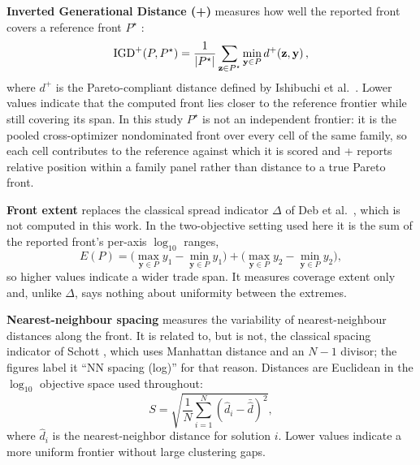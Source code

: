         \textbf{Inverted Generational Distance (\IGD{}+)} measures how well the reported front covers a reference front \(P^\star\) \cite{veldhuizen1999moo,ishibuchi2015igd}:
        \begin{equation}
            \mathrm{IGD}^+(P,P^\star)
            = \frac{1}{|P^\star|}\sum_{\mathbf{z}\in P^\star}
              \min_{\mathbf{y}\in P} d^+\!\left(\mathbf{z},\mathbf{y}\right),
        \end{equation}
        where \(d^+\) is the Pareto-compliant distance defined by Ishibuchi et al.\ \cite{ishibuchi2015igd}. Lower values indicate that the computed front lies closer to the reference frontier while still covering its span. In this study \(P^\star\) is not an independent frontier: it is the pooled cross-optimizer nondominated front over every cell of the same family, so each cell contributes to the reference against which it is scored and \IGD{}+ reports relative position within a family panel rather than distance to a true Pareto front.

        \textbf{Front extent} replaces the classical spread indicator \(\Delta\) of Deb et al.\ \cite{deb2002nsgaii}, which is not computed in this work. In the two-objective setting used here it is the sum of the reported front's per-axis \(\log_{10}\) ranges,
        \begin{equation}
            E(P)=\bigl(\max_{\mathbf{y}\in P}y_1-\min_{\mathbf{y}\in P}y_1\bigr)+\bigl(\max_{\mathbf{y}\in P}y_2-\min_{\mathbf{y}\in P}y_2\bigr),
        \end{equation}
        so higher values indicate a wider trade span. It measures coverage extent only and, unlike \(\Delta\), says nothing about uniformity between the extremes.

        \textbf{Nearest-neighbour spacing} measures the variability of nearest-neighbour distances along the front. It is related to, but is not, the classical spacing indicator of Schott \cite{schott1995spacing}, which uses Manhattan distance and an \(N-1\) divisor; the figures label it ``NN spacing (log)'' for that reason. Distances are Euclidean in the \(\log_{10}\) objective space used throughout:
        \begin{equation}
            S
            = \sqrt{\frac{1}{N}\sum_{i=1}^{N}\left(\hat d_i-\bar{\hat d}\right)^2},
        \end{equation}
        where \(\hat d_i\) is the nearest-neighbor distance for solution \(i\). Lower values indicate a more uniform frontier without large clustering gaps.

